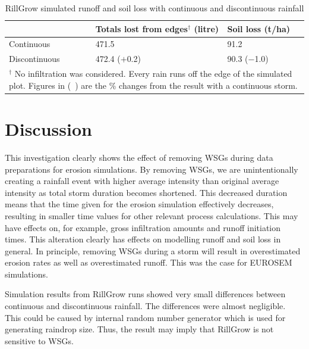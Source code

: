 \begin{table}[htbp]
  \centering
  \caption{RillGrow simulated runoff and soil loss with continuous and
discontinuous rainfall}
  \label{tab:RillGrowRunoffAndSoilLossWithContAndDiscontRainfall}
    \begin{tabular}{lll}
      \toprule
  & Totals lost from edges$^\dagger$ (litre) & Soil loss (t/ha) \\
      \midrule
      Continuous & 471.5 & 91.2 \\
      Discontinuous & 472.4 ($+$0.2)& 90.3 ($-$1.0)\\
      \bottomrule
      \multicolumn{3}{p{11cm}}{\footnotesize $^\dagger$ No infiltration was
considered. Every rain runs off the edge of the simulated plot. Figures in (\ )
are the \% changes from the result with a continuous storm.}
    \end{tabular}
\end{table}


\section{Discussion}
\label{sec:InterStormPeriodsWithinAStormDiscussion}

This investigation clearly shows the effect of removing WSGs during data
preparations for erosion simulations. By removing WSGs, we are unintentionally
creating a rainfall event with higher average intensity than original average
intensity as total storm duration becomes shortened. This decreased duration
means that the time given for the erosion simulation effectively decreases,
resulting in smaller time values for other relevant process calculations. This
may have effects on, for example, gross infiltration amounts and runoff
initiation times. This alteration clearly has effects on modelling
runoff and soil loss in general. In principle, removing WSGs during a storm will
result in overestimated erosion rates as well as overestimated runoff. This was
the case for EUROSEM simulations.

Simulation results from RillGrow runs showed very small differences between
continuous and discontinuous rainfall. The differences were almost negligible.
This could be caused by internal random number generator which is used for
generating raindrop size. Thus, the result may imply that RillGrow is not
sensitive to WSGs.


